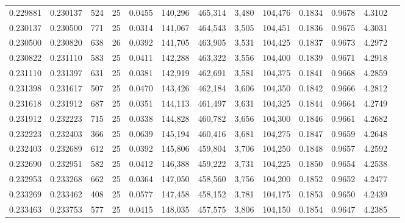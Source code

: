 \begin{tabular}{rrrrrrrrrrrrr}
0.229881 & 0.230137 &   524 &  25 &                                     0.0455 & 140,296 & 465,314 &   3,480 & 104,476 & 0.1834 & 0.9678 & 4.3102 \\
0.230137 & 0.230500 &   771 &  25 &                                     0.0314 & 141,067 & 464,543 &   3,505 & 104,451 & 0.1836 & 0.9675 & 4.3031 \\
0.230500 & 0.230820 &   638 &  26 &                                     0.0392 & 141,705 & 463,905 &   3,531 & 104,425 & 0.1837 & 0.9673 & 4.2972 \\
0.230822 & 0.231110 &   583 &  25 &                                     0.0411 & 142,288 & 463,322 &   3,556 & 104,400 & 0.1839 & 0.9671 & 4.2918 \\
0.231110 & 0.231397 &   631 &  25 &                                     0.0381 & 142,919 & 462,691 &   3,581 & 104,375 & 0.1841 & 0.9668 & 4.2859 \\
0.231398 & 0.231617 &   507 &  25 &                                     0.0470 & 143,426 & 462,184 &   3,606 & 104,350 & 0.1842 & 0.9666 & 4.2812 \\
0.231618 & 0.231912 &   687 &  25 &                                     0.0351 & 144,113 & 461,497 &   3,631 & 104,325 & 0.1844 & 0.9664 & 4.2749 \\
0.231912 & 0.232223 &   715 &  25 &                                     0.0338 & 144,828 & 460,782 &   3,656 & 104,300 & 0.1846 & 0.9661 & 4.2682 \\
0.232223 & 0.232403 &   366 &  25 &                                     0.0639 & 145,194 & 460,416 &   3,681 & 104,275 & 0.1847 & 0.9659 & 4.2648 \\
0.232403 & 0.232689 &   612 &  25 &                                     0.0392 & 145,806 & 459,804 &   3,706 & 104,250 & 0.1848 & 0.9657 & 4.2592 \\
0.232690 & 0.232951 &   582 &  25 &                                     0.0412 & 146,388 & 459,222 &   3,731 & 104,225 & 0.1850 & 0.9654 & 4.2538 \\
0.232953 & 0.233268 &   662 &  25 &                                     0.0364 & 147,050 & 458,560 &   3,756 & 104,200 & 0.1852 & 0.9652 & 4.2477 \\
0.233269 & 0.233462 &   408 &  25 &                                     0.0577 & 147,458 & 458,152 &   3,781 & 104,175 & 0.1853 & 0.9650 & 4.2439 \\
0.233463 & 0.233753 &   577 &  25 &                                     0.0415 & 148,035 & 457,575 &   3,806 & 104,150 & 0.1854 & 0.9647 & 4.2385 \\

\end{tabular}
